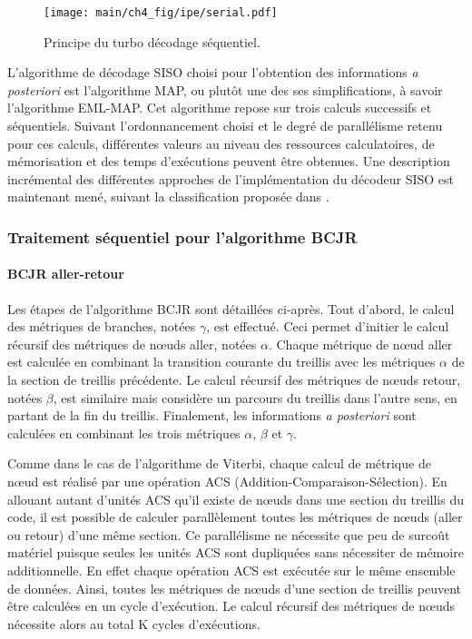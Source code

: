 \begin{figure}[!h]
	\centering
	\texttt{[image: main/ch4\_fig/ipe/serial.pdf]}
	\caption{Principe du turbo décodage séquentiel. \label{fig:turbo_seq}}
\end{figure} 

L'algorithme de décodage SISO choisi pour l’obtention des informations \textit{a posteriori} est l'algorithme MAP, 
ou plutôt une des ses simplifications, à savoir l'algorithme EML-MAP. Cet algorithme repose sur trois calculs successifs et 
séquentiels. Suivant l'ordonnancement choisi et le degré de parallélisme retenu pour ces calculs, différentes valeurs 
au niveau des ressources calculatoires, de mémorisation et des temps d'exécutions peuvent être obtenues. Une description
incrémental des différentes approches de l'implémentation du décodeur SISO est maintenant mené, suivant la 
classification proposée dans \cite{Muller2010}.

\subsubsection{Traitement séquentiel pour l'algorithme BCJR}
\paragraph*{BCJR aller-retour}
Les étapes de l'algorithme BCJR sont détaillées ci-après. Tout d'abord, le calcul des métriques de branches, notées 
$\gamma$, est effectué. Ceci permet d’initier le calcul récursif des métriques de nœuds aller, notées $\alpha$. Chaque 
métrique de nœud aller est calculée en combinant la transition courante du treillis avec les métriques $\alpha$ de la 
section de treillis précédente. Le calcul récursif des métriques de nœuds retour, notées $\beta$, est similaire mais
considère un parcours du treillis %
dans l'autre sens, en partant de la fin du treillis. Finalement, les 
informations \textit{a posteriori} sont calculées en combinant les trois métriques $\alpha$, $\beta$ et $\gamma$. 

Comme dans le cas de l'algorithme de Viterbi, chaque calcul de métrique de nœud est réalisé par une opération ACS 
(Addition-Comparaison-Sélection). En allouant autant d'unités ACS qu'il existe de nœuds dans une section du treillis 
du code, il est possible de calculer parallèlement toutes les métriques de nœuds (aller ou retour) d'une même section. Ce
parallélisme ne nécessite que peu de surcoût matériel puisque seules les unités ACS sont dupliquées sans nécessiter
de mémoire additionnelle. En effet chaque opération ACS est exécutée sur le même ensemble de données. Ainsi, toutes les 
métriques de nœuds d'une section de treillis peuvent être calculées en un cycle d'exécution. Le calcul récursif des métriques de 
nœuds nécessite alors au total K cycles d'exécutions.

